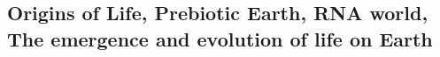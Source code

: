 
\subsection{Origins of Life, Prebiotic Earth, RNA world, The emergence and evolution of life on Earth}
%
%

